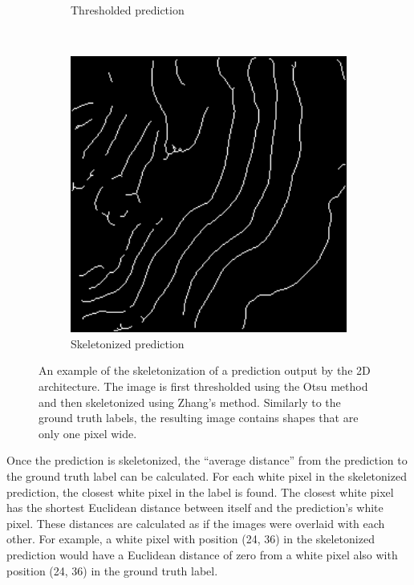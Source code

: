 \begin{figure}[t]
\begin{subfigure}[t]{0.32\textwidth}
        \caption{Thresholded prediction}
    \end{subfigure}
    ~
    \begin{subfigure}[t]{0.32\textwidth}
        \centering
        \includegraphics[width=1\textwidth, valign=c]{images/skel-skel.png}
        \caption{Skeletonized prediction}
    \end{subfigure}
    \caption{An example of the skeletonization of a prediction output by the 2D architecture. The image is first thresholded using the Otsu method and then skeletonized using Zhang's method. Similarly to the ground truth labels, the resulting image contains shapes that are only one pixel wide.}
    \label{fig:skeletonisation}
\end{figure}

Once the prediction is skeletonized, the ``average distance'' from the prediction to the ground truth label can be calculated. For each white pixel in the skeletonized prediction, the closest white pixel in the label is found. The closest white pixel has the shortest Euclidean distance between itself and the prediction's white pixel. These distances are calculated as if the images were overlaid with each other. For example, a white pixel with position (24, 36) in the skeletonized prediction would have a Euclidean distance of zero from a white pixel also with position (24, 36) in the ground truth label.

